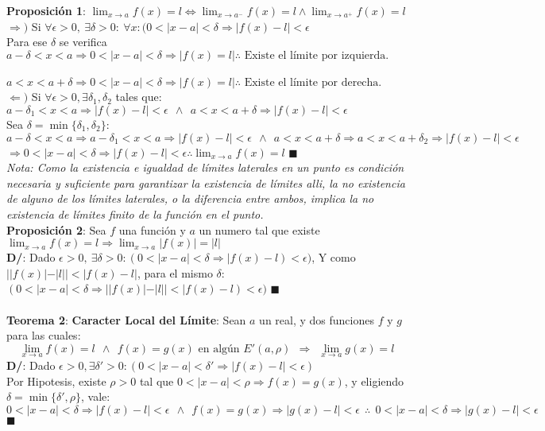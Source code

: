 \documentclass[11pt,a4paper]{article}
\newcommand*{\QEDA}{\null\nobreak\hfill\ensuremath{\blacksquare}}
\begin{document}
\noindent \textbf{Proposici\'on 1}: $\displaystyle{ \lim_{x \to a} f(x) = l \iff \lim_{x \to a^-} f(x) = l \land \lim_{x \to a^+} f(x) = l}$\\
$\Rightarrow)$ Si $\forall \epsilon > 0,\ \exists \delta > 0:\ \forall x: (0<|x-a|<\delta \Rightarrow |f(x)-l|<\epsilon$\\
Para ese $\delta$ se verifica \ $a-\delta<x<a \Rightarrow 0<|x-a|<\delta \Rightarrow |f(x)=l| \therefore \text{ Existe el l\'imite por izquierda.}$\\
\indent \indent \indent \indent \indent \ \ \ \ \ \ $a<x<a+\delta \Rightarrow 0<|x-a|<\delta \Rightarrow |f(x)=l| \therefore \text{ Existe el l\'imite por derecha.}$ \\
$\Leftarrow)$ Si $\forall \epsilon > 0, \exists \delta_1, \delta_2$ tales que: \ \
$a-\delta_1 < x < a \Rightarrow |f(x)-l| < \epsilon \ \ \land \ \ a<x<a+\delta \Rightarrow |f(x)-l| < \epsilon$\\
Sea $\delta=\min\{\delta_1, \delta_2\}$:\\
$a-\delta<x<a \Rightarrow a-\delta_1<x<a \Rightarrow |f(x)-l| < \epsilon \ \ \land \ \ a<x<a+\delta \Rightarrow a<x<a+\delta_2 \Rightarrow |f(x)-l|<\epsilon$\\
$\Rightarrow 0<|x-a|<\delta \Rightarrow |f(x)-l| < \epsilon \therefore \displaystyle{\lim_{x \to a} f(x) = l}$ \QEDA \\

\textit{Nota: Como la existencia e igualdad de l\'imites laterales en un punto es condici\'on necesaria y suficiente para garantizar la existencia de l\'imites alli, la no existencia de alguno de los l\'imites laterales, o la diferencia entre ambos, implica la no existencia de l\'imites finito de la funci\'on en el punto.}\\

\noindent \textbf{Proposici\'on 2}: Sea $f$ una funci\'on y $a$ un numero tal que existe $\displaystyle{\lim_{x\to a}f(x) = l} \Rightarrow \lim_{x\to a}|f(x)|=|l|$\\
\textbf{D/}: Dado $\epsilon > 0,\ \exists \delta > 0 : (0<|x-a|<\delta \Rightarrow |f(x)-l)<\epsilon)$, Y como \\
$||f(x)|-|l|| < |f(x)-l|$, para el mismo $\delta$: $(0<|x-a|<\delta \Rightarrow ||f(x)|-|l|| < |f(x)-l)<\epsilon)$ \QEDA \\ \\

\noindent \textbf{Teorema 2}: \textbf{Caracter Local del L\'imite}: Sean $a$ un real, y dos funciones $f$ y $g$ para las cuales:
$$\displaystyle{\lim_{x\to a}f(x) = l \ \ \land \ \ f(x) = g(x) \text{ en alg\'un } E'(a, \rho) \ \ \Rightarrow \ \ \lim_{x\to a}g(x) = l}$$
\textbf{D/}: Dado $\epsilon>0, \exists \delta'>0 : (0<|x-a|<\delta' \Rightarrow |f(x)-l|<\epsilon)$\\
Por Hipotesis, existe $\rho > 0$ tal que $0<|x-a|<\rho \Rightarrow f(x)=g(x)$, y eligiendo $\delta = \min\{\delta', \rho\}$, vale:\\
$0<|x-a|<\delta \Rightarrow |f(x)-l|<\epsilon \ \ \land \ \ f(x)=g(x) \Rightarrow |g(x)-l|<\epsilon \ \ \therefore \ \ 0<|x-a|<\delta \Rightarrow |g(x)-l|<\epsilon$ \QEDA \\ \\
\end{document}
